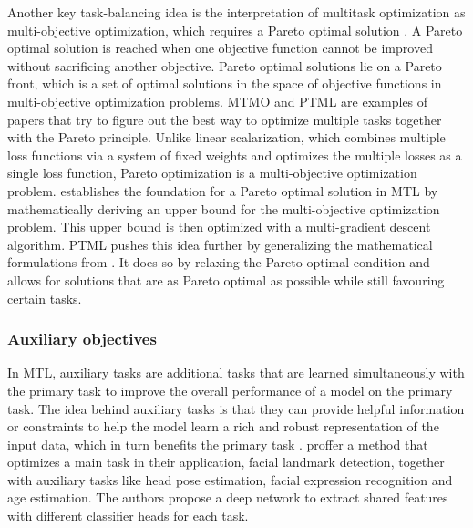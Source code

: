 \documentclass[times,twocolumn,final]{elsarticle}
\begin{document}
Another key task-balancing idea is the interpretation of multitask optimization as multi-objective optimization, which requires a Pareto optimal solution \citep{MTMO_koltun,lin2019pareto}.
A Pareto optimal solution is reached when one objective function cannot be improved without sacrificing another objective. Pareto optimal solutions lie on a Pareto front, which is a set of optimal solutions in the space of objective functions in multi-objective optimization problems.  MTMO \citep{MTMO_koltun} and PTML \citep{lin2019pareto} are examples of papers that try to figure out the best way to optimize multiple tasks together with the Pareto principle. 
Unlike linear scalarization, which combines multiple loss functions via a system of fixed weights and optimizes the multiple losses as a single loss function, Pareto optimization is a multi-objective optimization problem.
\citet{MTMO_koltun} establishes the foundation for a Pareto optimal solution in MTL by mathematically deriving an upper bound for the multi-objective optimization problem.
This upper bound is then optimized with a multi-gradient descent algorithm. 
PTML pushes this idea further by generalizing the mathematical formulations from \citet{MTMO_koltun}. It does so by relaxing the Pareto optimal condition and allows for solutions that are as Pareto optimal as possible while still favouring certain tasks.



\subsubsection{Auxiliary objectives} \label{sec::multitask_learning_natural_images::auxiliary_tasks}
In MTL, auxiliary tasks are additional tasks that are learned simultaneously with the primary task to improve the overall performance of a model on the primary task. The idea behind auxiliary tasks is that they can provide helpful information or constraints to help the model learn a rich and robust representation of the input data, which in turn benefits the primary task \citep{liebel2018auxiliary}.
\citet{zhang2014facial} proffer a method that optimizes a main task in their application, facial landmark detection, together with auxiliary tasks like head pose estimation, facial expression recognition and age estimation. The authors propose a deep network to extract shared features with different classifier heads for each task. 
\end{document}
